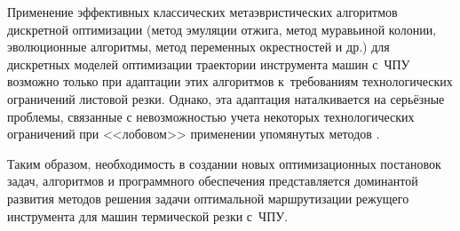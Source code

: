 Применение эффективных классических метаэвристических
алгоритмов дискретной оптимизации
(метод эмуляции отжига,
метод муравьиной колонии,
эволюционные алгоритмы,
метод переменных окрестностей и др.)
для дискретных моделей оптимизации траектории инструмента машин с~ЧПУ
возможно только при адаптации этих алгоритмов к~требованиям
технологических ограничений листовой резки.
Однако, эта адаптация наталкивается на серьёзные проблемы,
связанные с невозможностью учета некоторых технологических ограничений при
<<лобовом>> применении упомянутых методов
\cite{bi:panteleev2009,bi:Reihaneh2012,bi:Karapetyan2011,bi:gendreau2010handbook,bi:Ghilas2016Aug,Helsgaun-2015}.

Таким образом,
необходимость в создании новых оптимизационных постановок задач,
алгоритмов и программного обеспечения представляется
доминантой развития методов решения
задачи оптимальной маршрутизации
режущего инструмента для
машин термической резки с~ЧПУ.
